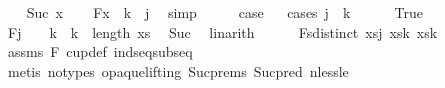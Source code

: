 \begin{isabellebody}
\ \ \isamarkupfalse%
\ {\isacharparenleft}{\kern0pt}Suc\ x{\isacharparenright}{\kern0pt}\isanewline
\ \ \isamarkupfalse%
\ F{}{\isacharcolon}{\kern0pt}{\isachardoublequoteopen}x\ {\isacharequal}{\kern0pt}\ {\isacharparenleft}{\kern0pt}k{\isacharminus}{\kern0pt}{}{\isacharparenright}{\kern0pt}\ {\isacharminus}{\kern0pt}\ j{\isachardoublequoteclose}\ \isamarkupfalse%
\ simp\isanewline
\ \ \isamarkupfalse%
\ \isamarkupfalse%
\ {\isacharquery}{\kern0pt}case\isanewline
\ \ \isamarkupfalse%
{\isacharparenleft}{\kern0pt}cases\ {\isachardoublequoteopen}j{\isacharplus}{\kern0pt}{}\ {\isasymle}\ k{\isachardoublequoteclose}{\isacharparenright}{\kern0pt}\isanewline
\ \ \ \ \isamarkupfalse%
\ True\isanewline
\ \ \ \ \isamarkupfalse%
\ F{}{\isacharcolon}{\kern0pt}{\isachardoublequoteopen}j\ {\isacharplus}{\kern0pt}\ {}\ {\isacharless}{\kern0pt}\ {\isacharparenleft}{\kern0pt}k{\isacharminus}{\kern0pt}{}{\isacharparenright}{\kern0pt}\ {\isasymand}\ {\isacharparenleft}{\kern0pt}k{\isacharminus}{\kern0pt}{}{\isacharparenright}{\kern0pt}\ {\isacharless}{\kern0pt}\ length\ xs{\isachardoublequoteclose}\ \isamarkupfalse%
\ Suc{\isacharparenleft}{\kern0pt}{}{\isacharparenright}{\kern0pt}\ \isamarkupfalse%
\ linarith\isanewline
\ \ \ \ \isamarkupfalse%
\ F{}{\isacharcolon}{\kern0pt}{\isachardoublequoteopen}sdistinct\ {\isacharbrackleft}{\kern0pt}xs{\isacharbang}{\kern0pt}j{\isacharcomma}{\kern0pt}\ xs{\isacharbang}{\kern0pt}{\isacharparenleft}{\kern0pt}k{\isacharminus}{\kern0pt}{}{\isacharparenright}{\kern0pt}{\isacharcomma}{\kern0pt}\ xs{\isacharbang}{\kern0pt}k{\isacharbrackright}{\kern0pt}{\isachardoublequoteclose}\ \isanewline
\ \ \ \ \ \ \isamarkupfalse%
\ assms{\isacharparenleft}{\kern0pt}{}{\isacharparenright}{\kern0pt}\ F{}\ cup{\isacharunderscore}{\kern0pt}def\ ind{\isacharunderscore}{\kern0pt}seq{\isacharunderscore}{\kern0pt}subseq\isanewline
\ \ \ \ \ \ \isamarkupfalse%
\ {\isacharparenleft}{\kern0pt}metis\ {\isacharparenleft}{\kern0pt}no{\isacharunderscore}{\kern0pt}types{\isacharcomma}{\kern0pt}\ opaque{\isacharunderscore}{\kern0pt}lifting{\isacharparenright}{\kern0pt}\ Suc{\isachardot}{\kern0pt}prems\ Suc{\isacharunderscore}{\kern0pt}pred{\isacharprime}{\kern0pt}\ nless{\isacharunderscore}{\kern0pt}le\isanewline

\end{isabellebody}
